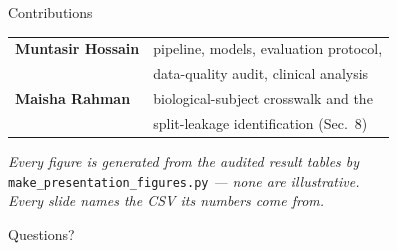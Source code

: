 \documentclass[aspectratio=169,11pt]{beamer}
\begin{document}
\begin{frame}{Contributions}
\begin{center}
\begin{tabular}{ll}
\toprule
\textbf{Muntasir Hossain} & pipeline, models, evaluation protocol, \\
                          & data-quality audit, clinical analysis \\[4pt]
\textbf{Maisha Rahman}    & biological-subject crosswalk and the \\
                          & split-leakage identification (Sec.\ 8) \\
\bottomrule
\end{tabular}
\end{center}

\vspace{1.2em}
\begin{center}
\emph{Every figure is generated from the audited result tables by} \\
\texttt{make\_presentation\_figures.py} \emph{--- none are illustrative.} \\[4pt]
\emph{Every slide names the CSV its numbers come from.}
\end{center}

\vspace{1.2em}
\begin{center}\Large Questions?\end{center}
\end{frame}
\end{document}
